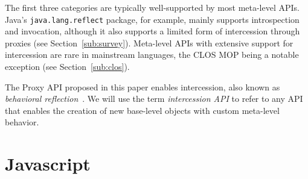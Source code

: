 \documentclass{sig-alternate}
\begin{document}
The first three categories are typically well-supported by most meta-level APIs. Java's \texttt{java.lang.reflect} package, for example, mainly supports introspection and invocation, although it also supports a limited form of intercession through proxies (see Section~\ref{sub:survey}). Meta-level APIs with extensive support for intercession are rare in mainstream languages, the CLOS MOP being a notable exception (see Section~\ref{sub:clos}).

The Proxy API proposed in this paper enables intercession, also known as \emph{behavioral reflection}~\cite{ferber89computational}. We will use the term \emph{intercession API} to refer to any API that enables the creation of new base-level objects with custom meta-level behavior.




\section{Javascript}
\end{document}
